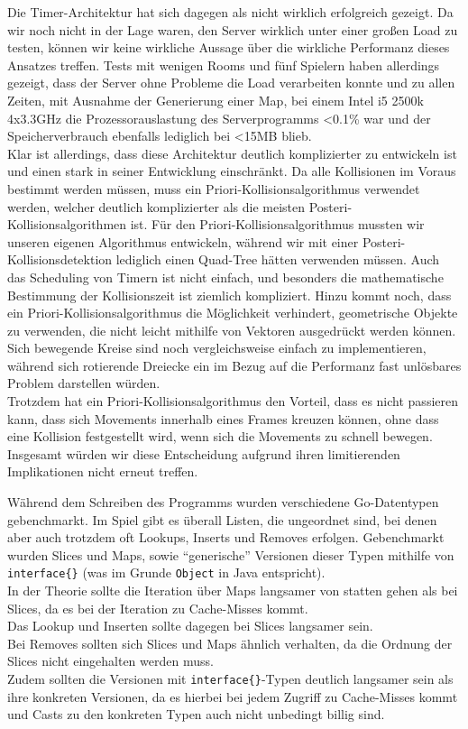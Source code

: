 Die Timer-Architektur hat sich dagegen als nicht wirklich erfolgreich gezeigt. Da wir noch nicht in der Lage waren, den Server wirklich unter einer großen Load zu testen, können wir keine wirkliche Aussage über die wirkliche Performanz dieses Ansatzes treffen. Tests mit wenigen Rooms und fünf Spielern haben allerdings gezeigt, dass der Server ohne Probleme die Load verarbeiten konnte und zu allen Zeiten, mit Ausnahme der Generierung einer Map, bei einem Intel i5 2500k 4x3.3GHz die Prozessorauslastung des Serverprogramms <0.1\% war und der Speicherverbrauch ebenfalls lediglich bei <15MB blieb.\\
Klar ist allerdings, dass diese Architektur deutlich komplizierter zu entwickeln ist und einen stark in seiner Entwicklung einschränkt. Da alle Kollisionen im Voraus bestimmt werden müssen, muss ein Priori-Kollisionsalgorithmus verwendet werden, welcher deutlich komplizierter als die meisten Posteri-Kollisionsalgorithmen ist. Für den Priori-Kollisionsalgorithmus mussten wir unseren eigenen Algorithmus entwickeln, während wir mit einer Posteri-Kollisionsdetektion lediglich einen Quad-Tree hätten verwenden müssen. Auch das Scheduling von Timern ist nicht einfach, und besonders die mathematische Bestimmung der Kollisionszeit ist ziemlich kompliziert. Hinzu kommt noch, dass ein Priori-Kollisionsalgorithmus die Möglichkeit verhindert, geometrische Objekte zu verwenden, die nicht leicht mithilfe von Vektoren ausgedrückt werden können. Sich bewegende Kreise sind noch vergleichsweise einfach zu implementieren, während sich rotierende Dreiecke ein im Bezug auf die Performanz fast unlösbares Problem darstellen würden. \\
Trotzdem hat ein Priori-Kollisionsalgorithmus den Vorteil, dass es nicht passieren kann, dass sich Movements innerhalb eines Frames kreuzen können, ohne dass eine Kollision festgestellt wird, wenn sich die Movements zu schnell bewegen. \\
Insgesamt würden wir diese Entscheidung aufgrund ihren limitierenden Implikationen nicht erneut treffen.

Während dem Schreiben des Programms wurden verschiedene Go-Datentypen gebenchmarkt. Im Spiel gibt es überall Listen, die ungeordnet sind, bei denen aber auch trotzdem oft Lookups, Inserts und Removes erfolgen. Gebenchmarkt wurden Slices und Maps, sowie ``generische'' Versionen dieser Typen mithilfe von \verb+interface{}+ (was im Grunde \verb+Object+ in Java entspricht). \\
In der Theorie sollte die Iteration über Maps langsamer von statten gehen als bei Slices, da es bei der Iteration zu Cache-Misses kommt. \\
Das Lookup und Inserten sollte dagegen bei Slices langsamer sein. \\
Bei Removes sollten sich Slices und Maps ähnlich verhalten, da die Ordnung der Slices nicht eingehalten werden muss. \\
Zudem sollten die Versionen mit \verb+interface{}+-Typen deutlich langsamer sein als ihre konkreten Versionen, da es hierbei bei jedem Zugriff zu Cache-Misses kommt und Casts zu den konkreten Typen auch nicht unbedingt billig sind. \\

